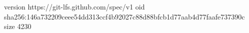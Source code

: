 version https://git-lfs.github.com/spec/v1
oid sha256:146a732209ceee54dd313ccf4b92027c88d88bfcb1d77aab4d77faafe737390c
size 4230
